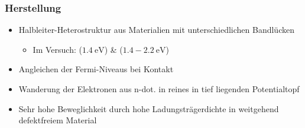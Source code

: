 \documentclass{beamer}
\begin{document}
\begin{frame}
    \frametitle{Herstellung}

\begin{itemize}
    \item Halbleiter-Heterostruktur aus Materialien mit unterschiedlichen Bandlücken
    \begin{itemize}
        \item Im Versuch:  ($\SI{1.4}{\eV}$) \&  ($1.4- \SI{2.2}{\eV}$)
    \end{itemize}
    \item Angleichen der Fermi-Niveaus bei Kontakt 
    \item Wanderung der Elektronen aus n-dot.  in reines  in tief liegenden Potentialtopf
    \item Sehr hohe Beweglichkeit durch hohe Ladungsträgerdichte in weitgehend defektfreiem Material
\end{itemize}


\end{frame}
\end{document}
